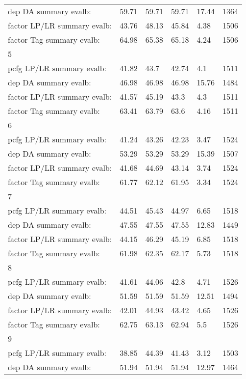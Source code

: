 \begin{longtable}{|p{}|p{}|p{}|p{}|p{}|p{}|}
    dep DA summary evalb: & 59.71 & 59.71 & 59.71 & 17.44 & 1364\\
    factor LP/LR summary evalb: & 43.76 & 48.13 & 45.84 & 4.38 & 1506\\
    factor Tag summary evalb: & 64.98 & 65.38 & 65.18 & 4.24 & 1506\\
    5 &  &  &  &  & \\
    pcfg LP/LR summary evalb: & 41.82 & 43.7 & 42.74 & 4.1 & 1511\\
    dep DA summary evalb: & 46.98 & 46.98 & 46.98 & 15.76 & 1484\\
    factor LP/LR summary evalb: & 41.57 & 45.19 & 43.3 & 4.3 & 1511\\
    factor Tag summary evalb: & 63.41 & 63.79 & 63.6 & 4.16 & 1511\\
    6 &  &  &  &  & \\
    pcfg LP/LR summary evalb: & 41.24 & 43.26 & 42.23 & 3.47 & 1524\\
    dep DA summary evalb: & 53.29 & 53.29 & 53.29 & 15.39 & 1507\\
    factor LP/LR summary evalb: & 41.68 & 44.69 & 43.14 & 3.74 & 1524\\
    factor Tag summary evalb: & 61.77 & 62.12 & 61.95 & 3.34 & 1524\\
    7 &  &  &  &  & \\
    pcfg LP/LR summary evalb: & 44.51 & 45.43 & 44.97 & 6.65 & 1518\\
    dep DA summary evalb: & 47.55 & 47.55 & 47.55 & 12.83 & 1449\\
    factor LP/LR summary evalb: & 44.15 & 46.29 & 45.19 & 6.85 & 1518\\
    factor Tag summary evalb: & 61.98 & 62.35 & 62.17 & 5.73 & 1518\\
    8 &  &  &  &  & \\
    pcfg LP/LR summary evalb: & 41.61 & 44.06 & 42.8 & 4.71 & 1526\\
    dep DA summary evalb: & 51.59 & 51.59 & 51.59 & 12.51 & 1494\\
    factor LP/LR summary evalb: & 42.01 & 44.93 & 43.42 & 4.65 & 1526\\
    factor Tag summary evalb: & 62.75 & 63.13 & 62.94 & 5.5 & 1526\\
    9 &  &  &  &  & \\
    pcfg LP/LR summary evalb: & 38.85 & 44.39 & 41.43 & 3.12 & 1503\\
    dep DA summary evalb: & 51.94 & 51.94 & 51.94 & 12.97 & 1464\\

\end{longtable}
